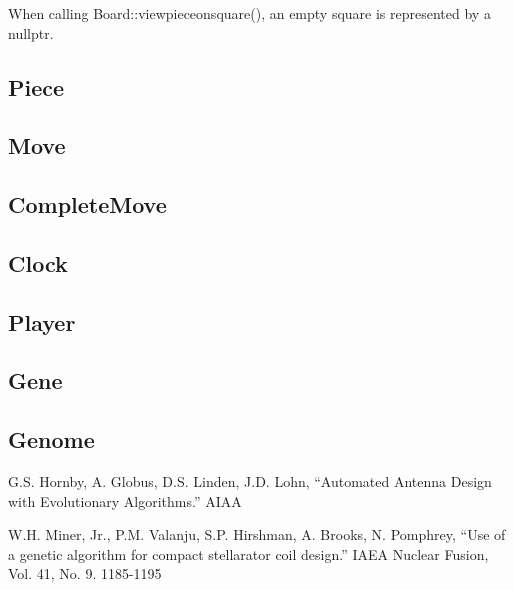 \documentclass[letter]{article}
\newcommand{\code}[1]{#1}
\renewcommand\_{\textunderscore\allowbreak}
\begin{document}
When calling \code{Board::view\_piece\_on\_square()}, an empty square is represented by a \code{nullptr}.

\subsection{Piece}

\subsection{Move}

\subsection{Complete\_Move}

\subsection{Clock}

\subsection{Player}

\subsection{Gene}

\subsection{Genome}



\begin{thebibliography}{9}

G.S. Hornby, A. Globus, D.S. Linden, J.D. Lohn, ``Automated Antenna Design with Evolutionary Algorithms.'' AIAA

W.H. Miner, Jr., P.M. Valanju, S.P. Hirshman, A. Brooks, N. Pomphrey, ``Use of a genetic algorithm for compact stellarator coil design.'' IAEA Nuclear Fusion, Vol. 41, No. 9. 1185-1195

\end{thebibliography}
\end{document}
